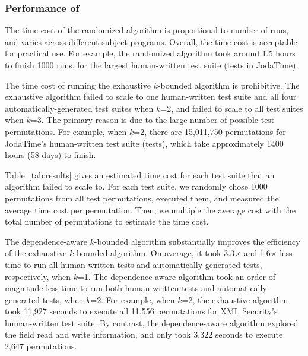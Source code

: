 \subsubsection{Performance of \ourtool}
\label{sec:performance}

The time cost of the randomized algorithm 
is proportional to number of runs, and
varies across different subject programs.
 Overall, the time cost is acceptable for practical use.
For example, the randomized algorithm took around 1.5 hours
to finish 1000 runs,  for the largest human-written test
suite (\jodatimetests tests in JodaTime).
 
The time cost of running the exhaustive $k$-bounded algorithm
is prohibitive. The exhaustive algorithm failed to
scale to one human-written test suite and all four automatically-generated
test suites when $k$=2, and failed to scale to all test suites
when $k$=3. The primary reason is due to the large
number of possible test permutations. 
For example, when $k$=2, there are 15,011,750 permutations
for JodaTime's human-written test suite (\jodatimetests tests),
which take approximately 1400 hours (58 days) to finish.

Table~\ref{tab:results} gives an estimated time cost for each
test suite that an algorithm failed to scale to. For each test suite,
we randomly chose 1000 permutations from all
test permutations, executed them, and measured the average time cost
per permutation. Then, we multiple
the average cost with the total number of permutations to estimate
the time cost.

The dependence-aware $k$-bounded algorithm substantially improves
the efficiency of the exhaustive $k$-bounded algorithm. On average,
it took 3.3$\times$ and 1.6$\times$ less time to run all
human-written tests and automatically-generated tests, respectively, when $k$=1.
The dependence-aware algorithm took an order of magnitude
less time to run both human-written tests and automatically-generated tests,
when $k$=2.
For example, when $k$=2, the exhaustive algorithm took 11,927 seconds
to execute all 11,556 permutations for XML Security's human-written test suite.
By contrast, the dependence-aware algorithm
explored the field read and write information, and
only took 3,322 seconds to execute 2,647 permutations.





